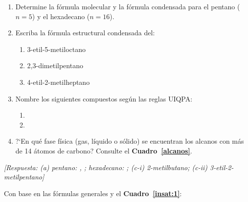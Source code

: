 \begin{bloque_ejercicios}
\begin{ejercicios}
\begin{enumerate}[label=\alph*)]
    \item Determine la f\'ormula molecular y la f\'ormula condensada
          para el pentano ($n = 5$) y el hexadecano ($n = 16$).
    \item Escriba la f\'ormula estructural condensada del:
          \begin{enumerate}[label=\roman*)]
              \item 3-etil-5-metiloctano
              \item 2,3-dimetilpentano
              \item 4-etil-2-metilheptano
          \end{enumerate}
    \item Nombre los siguientes compuestos seg\'un las reglas UIQPA:
          \begin{enumerate}[label=\roman*)]
              \item {}
              \item {}
          \end{enumerate}
    \item ?`En qu\'e fase f\'isica (gas, l\'iquido o s\'olido) se
          encuentran los alcanos con m\'as de 14 \'atomos de carbono?
          Consulte el \textbf{Cuadro~\ref{alcanos}}.
\end{enumerate}

\textit{[Respuesta: (a) pentano: , ;
hexadecano: ;
(c-i) 2-metilbutano;
(c-ii) 3-etil-2-metilpentano]}

\item Con base en las f\'ormulas generales y el
\textbf{Cuadro~\ref{insat:1}}:


\end{ejercicios}
\end{bloque_ejercicios}
